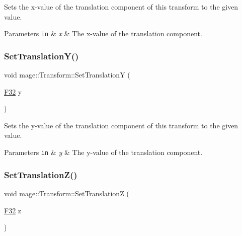 Sets the x-\/value of the translation component of this transform to the given value.


\begin{DoxyParams}[1]{Parameters}
\mbox{\tt in}  & {\em x} & The x-\/value of the translation component. \\
\hline
\end{DoxyParams}
\hypertarget{classmage_1_1_transform_ae33a9ea844cac0bdb303e4e347e576c3}{}\label{classmage_1_1_transform_ae33a9ea844cac0bdb303e4e347e576c3} 
\subsubsection{\texorpdfstring{Set\+Translation\+Y()}{SetTranslationY()}}
{\footnotesize\ttfamily void mage\+::\+Transform\+::\+Set\+TranslationY (\begin{DoxyParamCaption}\item[{\hyperlink{namespacemage_aa97e833b45f06d60a0a9c4fc22ae02c0}{F32}}]{y }\end{DoxyParamCaption})\hspace{0.3cm}{\ttfamily [noexcept]}}

Sets the y-\/value of the translation component of this transform to the given value.


\begin{DoxyParams}[1]{Parameters}
\mbox{\tt in}  & {\em y} & The y-\/value of the translation component. \\
\hline
\end{DoxyParams}
\hypertarget{classmage_1_1_transform_a71009b20361c01c0ffbd981986d323e8}{}\label{classmage_1_1_transform_a71009b20361c01c0ffbd981986d323e8} 
\subsubsection{\texorpdfstring{Set\+Translation\+Z()}{SetTranslationZ()}}
{\footnotesize\ttfamily void mage\+::\+Transform\+::\+Set\+TranslationZ (\begin{DoxyParamCaption}\item[{\hyperlink{namespacemage_aa97e833b45f06d60a0a9c4fc22ae02c0}{F32}}]{z }\end{DoxyParamCaption})\hspace{0.3cm}{\ttfamily [noexcept]}}


